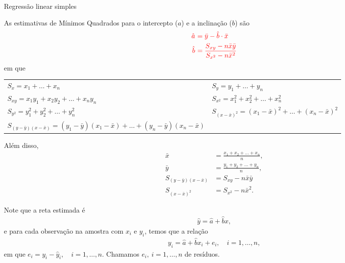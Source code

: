 \documentclass[8pt]{beamer}
\begin{document}
\begin{frame}{Regressão linear simples}
	
	{\scriptsize
	As estimativas de Mínimos Quadrados para o intercepto ($a$) e a inclinação ($b$) são
	\begin{align*}
		 \textcolor{red}{\hat{a}}\ &\textcolor{red}{=\bar{y}  - \hat{b} \cdot \bar{x}}\\
		\textcolor{red}{\hat{b}}\ &\textcolor{red}{= \dfrac{ S_{xy} - n \bar{x}\bar{y} }{S_{x^2} - n\bar{x}^2}}
	\end{align*}
	em que 
	\begin{table}
		\centering
		\begin{tabular}{l|l}
			 $S_{x} = x_1 + \dots + x_n$ & $S_{y} = y_1 + \dots + y_n$\\
			 $S_{xy} = x_1y_1 + x_2 y_2 + \dots + x_n y_n$ & $S_{x^2} = x_1^2 + x_2^2 + \dots + x_n^2$\\
			 $S_{y^2} = y_1^2 + y_2^2 + \dots + y_n^2$ & $S_{(x-\bar{x})^2} = (x_1 - \bar{x})^2 + \dots + (x_n - \bar{x})^2$ \\
			 $S_{(y-\bar{y})(x - \bar{x})} = (y_1 - \bar{y}) (x_1 - \bar{x}) + \dots + (y_n - \bar{y}) (x_n - \bar{x})$ & \\
		\end{tabular}
	\end{table}

	Além disso,
	\begin{align*}
		\bar{x} &= \frac{x_1 + x_2 + \dots +x_n }{n},\\
		\bar{y} &= \frac{y_1 + y_2 + \dots + y_n}{n},\\
		S_{(y-\bar{y})(x - \bar{x})} &= S_{xy} - n \bar{x} \bar{y} \\
		S_{(x-\bar{x})^2} &= S_{x^2} - n\bar{x}^2.
	\end{align*}
	\vfill

	Note que a reta estimada é 
	\begin{align*}
		\hat{y} = \hat{a} + \hat{b}x,
	\end{align*}
	e para cada observação na amostra com $x_i$ e $y_i$, temos que a relação
	\begin{align*}
		y_i = \hat{a} + \hat{b}x_i + e_i, \quad i =1, \dots, n,
	\end{align*}
	em que $e_i = y_i - \hat{y}_i, \quad i =1, \dots, n$. Chamamos $e_i,\ i=1, \dots, n$ de resíduos.
}
\end{frame}
\end{document}
